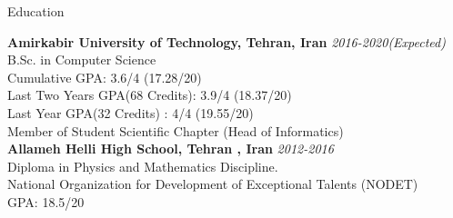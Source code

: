 \documentclass{resume} %
\begin{document}
	
	
	\begin{rSection}{Education}
		
		{\bf  Amirkabir University of Technology, Tehran, Iran} \hfill {\em 2016-2020(Expected)} \\ 
		B.Sc. in Computer Science\\
		Cumulative GPA: 3.6/4 (17.28/20)\\
		Last Two Years GPA(68 Credits): 3.9/4 (18.37/20)\\
		Last Year GPA(32 Credits) : 4/4 (19.55/20)\\
		Member of Student Scientific Chapter (Head of Informatics) \\
		
		{\bf Allameh Helli High School, Tehran , Iran} \hfill {\em 2012-2016}\\ 
		Diploma in Physics and Mathematics Discipline.\\
		National Organization for Development of Exceptional Talents (NODET)\\
		GPA: 18.5/20\\
		
	\end{rSection}
	
	
\end{document}
